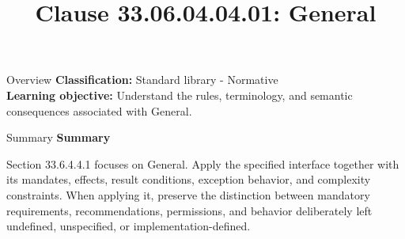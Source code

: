 \documentclass[10pt,letterpaper]{article}
\title{Clause 33.06.04.04.01: General}
\author{}
\date{}
\begin{document}
\maketitle
\begin{CornellOverviewBox}{Overview}
\textbf{Classification:} Standard library - Normative\\[2pt]
\textbf{Learning objective:} Understand the rules, terminology, and semantic consequences associated with General.
\end{CornellOverviewBox}\begin{CornellSummaryBox}{Summary}
{\sffamily\bfseries\color{Accent} Summary}\par\vspace{3pt}Section 33.6.4.4.1 focuses on General. Apply the specified interface together with its mandates, effects, result conditions, exception behavior, and complexity constraints. When applying it, preserve the distinction between mandatory requirements, recommendations, permissions, and behavior deliberately left undefined, unspecified, or implementation-defined.
\end{CornellSummaryBox}
\end{document}
